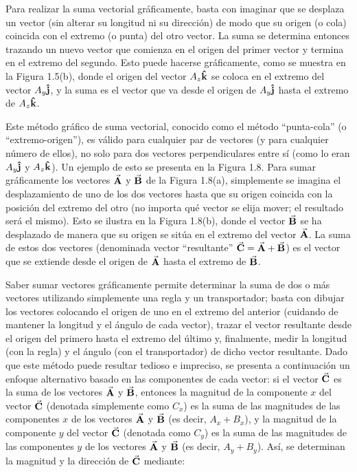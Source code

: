 \documentclass[hidelinks,12pt]{article}
\begin{document}
\par
Para realizar la suma vectorial gráficamente, basta con imaginar que se desplaza un vector (sin alterar su longitud ni su dirección) de modo que su origen (o cola) coincida con el extremo (o punta) del otro vector. La suma se determina entonces trazando un nuevo vector que comienza en el origen del primer vector y termina en el extremo del segundo. Esto puede hacerse gráficamente, como se muestra en la Figura 1.5(b), donde el origen del vector $A_{z} \vu{k}$ se coloca en el extremo del vector $A_{y} \vu{j}$, y la suma es el vector que va desde el origen de $A_{y} \vu{j}$ hasta el extremo de $A_{z} \vu{k}$.
\par
Este método gráfico de suma vectorial, conocido como el método \enquote{punta-cola} (o \enquote{extremo-origen}), es válido para cualquier par de vectores (y para cualquier número de ellos), no solo para dos vectores perpendiculares entre sí (como lo eran $A_{y} \vu{j}$ y $A_{z} \vu{k}$). Un ejemplo de esto se presenta en la Figura 1.8. Para sumar gráficamente los vectores $\va{A}$ y $\va{B}$ de la Figura 1.8(a), simplemente se imagina el desplazamiento de uno de los dos vectores hasta que su origen coincida con la posición del extremo del otro (no importa qué vector se elija mover; el resultado será el mismo). Esto se ilustra en la Figura 1.8(b), donde el vector $\va{B}$ se ha desplazado de manera que su origen se sitúa en el extremo del vector $\va{A}$. La suma de estos dos vectores (denominada vector \enquote{resultante} $\va{C} = \va{A} + \va{B}$) es el vector que se extiende desde el origen de $\va{A}$ hasta el extremo de $\va{B}$.
\par
Saber sumar vectores gráficamente permite determinar la suma de dos o más vectores utilizando simplemente una regla y un transportador; basta con dibujar los vectores colocando el origen de uno en el extremo del anterior (cuidando de mantener la longitud y el ángulo de cada vector), trazar el vector resultante desde el origen del primero hasta el extremo del último y, finalmente, medir la longitud (con la regla) y el ángulo (con el transportador) de dicho vector resultante. Dado que este método puede resultar tedioso e impreciso, se presenta a continuación un enfoque alternativo basado en las componentes de cada vector: si el vector $\va{C}$ es la suma de los vectores $\va{A}$ y $\va{B}$, entonces la magnitud de la componente $x$ del vector $\va{C}$ (denotada simplemente como $C_{x}$) es la suma de las magnitudes de las componentes $x$ de los vectores $\va{A}$ y $\va{B}$ (es decir, $A_{x} + B_{x}$), y la magnitud de la componente $y$ del vector $\va{C}$ (denotada como $C_{y}$) es la suma de las magnitudes de las componentes $y$ de los vectores $\va{A}$ y $\va{B}$ (es decir, $A_{y} + B_{y}$). Así, se determinan la magnitud y la dirección de $\va{C}$ mediante:
\end{document}
